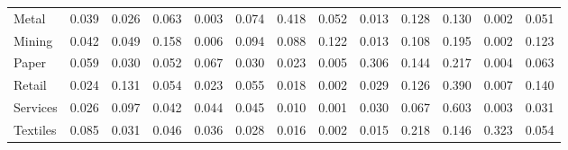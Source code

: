 \begin{table}[htbp]
\begin{tabular}{lcccccccccccc}
  Metal & \textcolor[RGB]{129,84,126}{0.039} & \textcolor[RGB]{159,103,96}{0.026} & \textcolor[RGB]{87,56,168}{0.063} & \textcolor[RGB]{234,151,21}{0.003} & \textcolor[RGB]{81,53,174}{0.074} & \textcolor[RGB]{5,3,250}{0.418} & \textcolor[RGB]{106,69,149}{0.052} & \textcolor[RGB]{202,131,53}{0.013} & \textcolor[RGB]{57,37,198}{0.128} & \textcolor[RGB]{53,34,202}{0.130} & \textcolor[RGB]{241,156,14}{0.002} & \textcolor[RGB]{108,70,147}{0.051} \\ 
  Mining & \textcolor[RGB]{128,82,128}{0.042} & \textcolor[RGB]{112,72,143}{0.049} & \textcolor[RGB]{39,25,216}{0.158} & \textcolor[RGB]{216,140,39}{0.006} & \textcolor[RGB]{69,45,186}{0.094} & \textcolor[RGB]{74,48,181}{0.088} & \textcolor[RGB]{62,40,193}{0.122} & \textcolor[RGB]{200,129,55}{0.013} & \textcolor[RGB]{64,41,191}{0.108} & \textcolor[RGB]{30,19,225}{0.195} & \textcolor[RGB]{244,158,11}{0.002} & \textcolor[RGB]{60,39,195}{0.123} \\ 
  Paper & \textcolor[RGB]{92,60,163}{0.059} & \textcolor[RGB]{152,99,103}{0.030} & \textcolor[RGB]{103,66,152}{0.052} & \textcolor[RGB]{85,55,170}{0.067} & \textcolor[RGB]{149,96,106}{0.030} & \textcolor[RGB]{170,110,85}{0.023} & \textcolor[RGB]{223,144,32}{0.005} & \textcolor[RGB]{18,11,237}{0.306} & \textcolor[RGB]{46,30,209}{0.144} & \textcolor[RGB]{28,18,227}{0.217} & \textcolor[RGB]{225,146,30}{0.004} & \textcolor[RGB]{89,57,166}{0.063} \\ 
  Retail & \textcolor[RGB]{165,107,90}{0.024} & \textcolor[RGB]{51,33,204}{0.131} & \textcolor[RGB]{101,65,154}{0.054} & \textcolor[RGB]{174,112,81}{0.023} & \textcolor[RGB]{96,62,159}{0.055} & \textcolor[RGB]{189,123,66}{0.018} & \textcolor[RGB]{246,159,9}{0.002} & \textcolor[RGB]{154,100,101}{0.029} & \textcolor[RGB]{58,38,197}{0.126} & \textcolor[RGB]{7,5,248}{0.390} & \textcolor[RGB]{211,136,44}{0.007} & \textcolor[RGB]{48,31,207}{0.140} \\ 
  Services & \textcolor[RGB]{161,104,94}{0.026} & \textcolor[RGB]{67,44,188}{0.097} & \textcolor[RGB]{126,81,129}{0.042} & \textcolor[RGB]{124,80,131}{0.044} & \textcolor[RGB]{122,79,133}{0.045} & \textcolor[RGB]{204,132,51}{0.010} & \textcolor[RGB]{251,163,4}{0.001} & \textcolor[RGB]{147,95,108}{0.030} & \textcolor[RGB]{83,54,172}{0.067} & \textcolor[RGB]{0,0,255}{0.603} & \textcolor[RGB]{227,147,28}{0.003} & \textcolor[RGB]{143,93,112}{0.031} \\ 
  Textiles & \textcolor[RGB]{76,49,179}{0.085} & \textcolor[RGB]{145,94,110}{0.031} & \textcolor[RGB]{119,77,136}{0.046} & \textcolor[RGB]{136,88,119}{0.036} & \textcolor[RGB]{158,102,97}{0.028} & \textcolor[RGB]{193,125,62}{0.016} & \textcolor[RGB]{237,154,18}{0.002} & \textcolor[RGB]{197,127,58}{0.015} & \textcolor[RGB]{27,17,228}{0.218} & \textcolor[RGB]{44,29,211}{0.146} & \textcolor[RGB]{14,9,241}{0.323} & \textcolor[RGB]{99,64,156}{0.054} \\ 

\end{tabular}
\end{table}

